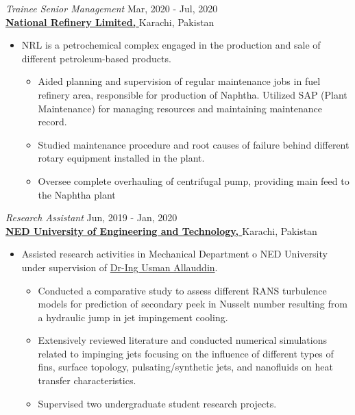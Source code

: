\documentclass[margin, 10pt]{res} %
\begin{document}
\begin{resume}


\emph{Trainee Senior Management} \hfill {\small Mar, 2020 -  Jul, 2020} \\
\href{http://www.nrlpak.com/}{\textbf{National Refinery Limited, }} Karachi, Pakistan
\begin{itemize}
    \item NRL is a petrochemical complex engaged in the production and sale of different petroleum-based products. 
    \begin{itemize}
        \item Aided planning and supervision of regular maintenance jobs in fuel refinery area, responsible for production of Naphtha. Utilized SAP (Plant Maintenance) for managing resources and maintaining maintenance record.
        \item Studied maintenance procedure and root causes of failure behind different rotary equipment installed in the plant.
        \item Oversee complete overhauling of centrifugal pump, providing main feed to the Naphtha plant

    \end{itemize}
\end{itemize}



\emph{Research Assistant} \hfill {\small Jun, 2019 -  Jan, 2020} \\
\href{https://www.neduet.edu.pk/}{\textbf{NED University of Engineering and Technology, \href{https://www.neduet.edu.pk/}{}}} Karachi, Pakistan
\begin{itemize}
    \item Assisted research activities in Mechanical Department o NED University under supervision of \href{https://scholar.google.com/citations?user=jOthSmQAAAAJ&hl=en}{Dr-Ing Usman Allauddin}.
    
    \begin{itemize}
        \item Conducted a comparative study to assess different RANS turbulence models for prediction of secondary peek in Nusselt number resulting from a hydraulic jump in jet impingement cooling.
        \item Extensively reviewed literature and conducted numerical simulations related to impinging jets focusing on the influence of different types of fins, surface topology, pulsating/synthetic jets, and nanofluids on heat transfer characteristics.
        \item Supervised two undergraduate student research projects. 
    \end{itemize}
\end{itemize}


\end{resume}
\end{document}
